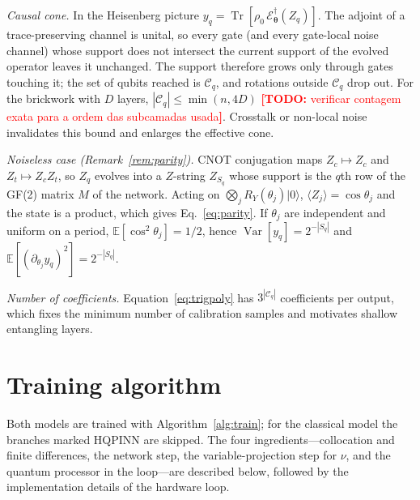 \documentclass[floatfix,aps,pra,twocolumn,showpacs,superscriptaddress,10pt,nofootinbib]{revtex4-2}
\newif\ifshowtodos \showtodostrue
\newcommand{\TODO}[1]{\ifshowtodos\textcolor{red}{\textbf{[TODO:} #1\textbf{]}}\fi}
\begin{document}
\begin{appendices}
\emph{Causal cone.} In the Heisenberg picture $y_q=\operatorname{Tr}[\rho_0\,\mathcal E^\dagger_{\bm\theta}(Z_q)]$. The adjoint of a trace-preserving channel is unital, so every gate (and every gate-local noise channel) whose support does not intersect the current support of the evolved operator leaves it unchanged. The support therefore grows only through gates touching it; the set of qubits reached is $\mathcal C_q$, and rotations outside $\mathcal C_q$ drop out. For the brickwork with $D$ layers, $|\mathcal C_q|\le\min(n,4D)$ \TODO{verificar contagem exata para a ordem das subcamadas usada}. Crosstalk or non-local noise invalidates this bound and enlarges the effective cone.

\emph{Noiseless case (Remark~\ref{rem:parity}).} CNOT conjugation maps $Z_c\mapsto Z_c$ and $Z_t\mapsto Z_cZ_t$, so $Z_q$ evolves into a $Z$-string $Z_{S_q}$ whose support is the $q$th row of the GF(2) matrix $M$ of the network. Acting on $\bigotimes_jR_Y(\theta_j)|0\rangle$, $\langle Z_j\rangle=\cos\theta_j$ and the state is a product, which gives Eq.~\eqref{eq:parity}. If $\theta_j$ are independent and uniform on a period, $\mathbb E[\cos^2\theta_j]=1/2$, hence $\operatorname{Var}[y_q]=2^{-|S_q|}$ and $\mathbb E[(\partial_{\theta_j}y_q)^2]=2^{-|S_q|}$.

\emph{Number of coefficients.} Equation~\eqref{eq:trigpoly} has $3^{|\mathcal C_q|}$ coefficients per output, which fixes the minimum number of calibration samples and motivates shallow entangling layers.

\section{Training algorithm}\label{app:training}
Both models are trained with Algorithm~\ref{alg:train}; for the classical model the branches marked HQPINN are skipped. The four ingredients---collocation and finite differences, the network step, the variable-projection step for $\nu$, and the quantum processor in the loop---are described below, followed by the implementation details of the hardware loop.


\end{appendices}
\end{document}
